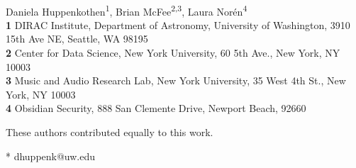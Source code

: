 \documentclass[10pt,letterpaper]{article}
\begin{document}
\vspace*{0.2in}

\begin{flushleft}
{\Large
\textbf{} %
}
\newline
\\
Daniela Huppenkothen\textsuperscript{1\Yinyang\textcurrency},
Brian McFee\textsuperscript{2,3\Yinyang},
Laura Nor\'{e}n\textsuperscript{4\Yinyang}
\\
\bigskip
\textbf{1} DIRAC Institute, Department of Astronomy, University of Washington, 3910 15th Ave NE, Seattle, WA 98195 
\\
\textbf{2} Center for Data Science, New York University,  60 5th Ave., New York, NY 10003
\\
\textbf{3} Music and Audio Research Lab, New York University, 35 West 4th St., New York, NY 10003
\\
\textbf{4} Obsidian Security, 888 San Clemente Drive, Newport Beach, 92660
\\
\bigskip

% 
%
\Yinyang These authors contributed equally to this work.





* dhuppenk@uw.edu

\end{flushleft}
\end{document}
